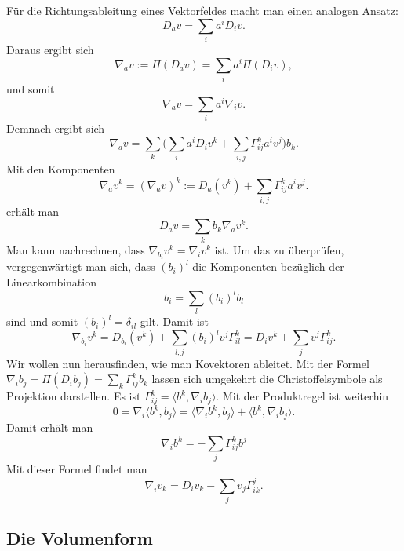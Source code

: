 \documentclass[a4paper,11pt,fleqn,twocolumn,twoside]{scrartcl}
\numberwithin{equation}{section}
\begin{document}
Für die Richtungsableitung eines Vektorfeldes macht man einen
analogen Ansatz:
\begin{equation}
D_a v = \sum_i a^i D_i v.
\end{equation}
Daraus ergibt sich
\begin{equation}
\nabla_a v := \Pi(D_a v) = \sum_i a^i \Pi(D_i v),
\end{equation}
und somit
\begin{equation}
\nabla_a v = \sum_i a^i \nabla_i v.
\end{equation}
Demnach ergibt sich
\begin{equation}
\nabla_a v = \sum_k \Big(\sum_i a^i D_i v^k
+\sum_{i,j}\Gamma_{ij}^k a^i v^j\Big) b_k.
\end{equation}
Mit den Komponenten
\begin{equation}
\nabla_a v^k = (\nabla_a v)^k := D_a(v^k) + \sum_{i,j}\Gamma_{ij}^k a^i v^j.
\end{equation}
erhält man
\begin{equation}
D_a v = \sum_k b_k \nabla_a v^k.
\end{equation}
Man kann nachrechnen, dass $\nabla_{b_i}v^k=\nabla_i v^k$ ist.
Um das zu überprüfen, vergegenwärtigt man sich, dass $(b_i)^l$
die Komponenten bezüglich der Linearkombination 
\begin{equation}
b_i = \sum_{l} (b_i)^l b_l
\end{equation}
sind und somit $(b_i)^l=\delta_{il}$ gilt. Damit ist
\[\nabla_{b_i} v^k = D_{b_i}(v^k)
+ \sum_{l,j}(b_i)^l v^j \Gamma_{il}^k
= D_i v^k + \sum_{j} v^j\Gamma_{ij}^k.\]
Wir wollen nun herausfinden, wie man Kovektoren ableitet.
Mit der Formel $\nabla_i b_j = \Pi(D_ib_j)=\sum_k\Gamma_{ij}^k b_k$
lassen sich umgekehrt die Christoffelsymbole als Projektion darstellen.
Es ist $\Gamma_{ij}^k = \langle b^k,\nabla_i b_j\rangle.$
Mit der Produktregel ist weiterhin
\begin{equation}
0=\nabla_i\langle b^k,b_j\rangle
= \langle \nabla_i b^k,b_j\rangle + \langle b^k,\nabla_i b_j\rangle.
\end{equation}
Damit erhält man
\begin{equation}
\nabla_i b^k = -\sum_{j}\Gamma_{ij}^kb^j
\end{equation}
Mit dieser Formel findet man
\begin{equation}
\nabla_i v_k = D_iv_k-\sum_{j}v_j\Gamma_{ik}^j.
\end{equation}

\subsection{Die Volumenform}
\end{document}
